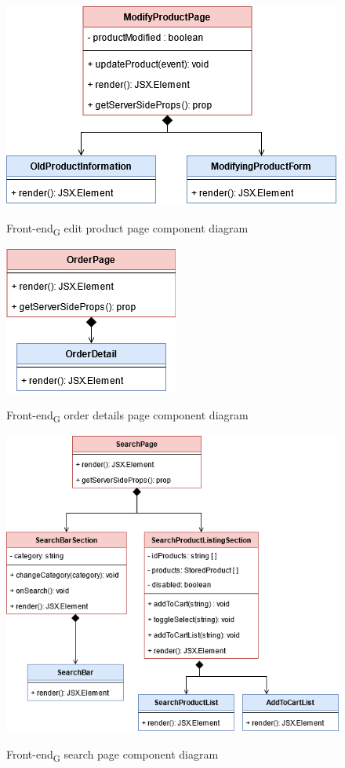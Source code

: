 \begin{figure}[H]
\centering
\includegraphics[scale=0.50]{res/Architettura/Frontend/img/modifyProduct}\\
\caption{Front-end\textsubscript{G} edit product page component diagram}
\end{figure}

\begin{figure}[H]
\centering
\includegraphics[scale=0.50]{res/Architettura/Frontend/img/order}\\
\caption{Front-end\textsubscript{G} order details page component diagram}
\end{figure}

\begin{figure}[H]
\centering
\includegraphics[scale=0.50]{res/Architettura/Frontend/img/search}\\
\caption{Front-end\textsubscript{G} search page component diagram}
\end{figure}

